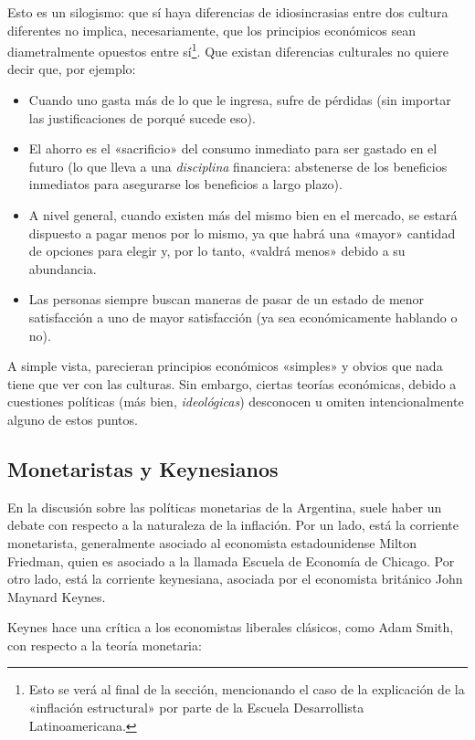 \documentclass[12pt,a4paper,twoside]{book}
\begin{document}
Esto es un silogismo: que sí haya diferencias de idiosincrasias entre dos cultura diferentes no implica, necesariamente, que los principios económicos sean diametralmente opuestos entre sí\footnote{Esto se verá al final de la sección, mencionando el caso de la explicación de la «inflación estructural» por parte de la Escuela Desarrollista Latinoamericana.}. Que existan diferencias culturales no quiere decir que, por ejemplo:

\begin{itemize}
\item Cuando uno gasta más de lo que le ingresa, sufre de pérdidas (sin importar las justificaciones de porqué sucede eso).
\item El ahorro es el «sacrificio» del consumo inmediato para ser gastado en el futuro (lo que lleva a una \textit{disciplina} financiera: abstenerse de los beneficios inmediatos para asegurarse los beneficios a largo plazo).
\item A nivel general, cuando existen más del mismo bien en el mercado, se estará dispuesto a pagar menos por lo mismo, ya que habrá una «mayor» cantidad de opciones para elegir y, por lo tanto, «valdrá menos» debido a su abundancia.
\item Las personas siempre buscan maneras de pasar de un estado de menor satisfacción a uno de mayor satisfacción (ya sea económicamente hablando o no).
\end{itemize}

A simple vista, parecieran principios económicos «simples» y obvios que nada tiene que ver con las culturas. Sin embargo, ciertas teorías económicas, debido a cuestiones políticas (más bien, \textit{ideológicas}) desconocen u omiten intencionalmente alguno de estos puntos.

\subsection{Monetaristas y Keynesianos}
En la discusión sobre las políticas monetarias de la Argentina, suele haber un debate con respecto a la naturaleza de la inflación. Por un lado, está la corriente monetarista, generalmente asociado al economista estadounidense Milton Friedman, quien es asociado a la llamada Escuela de Economía de Chicago. Por otro lado, está la corriente keynesiana, asociada por el economista británico John Maynard Keynes.

Keynes hace una crítica a los economistas liberales clásicos, como Adam Smith, con respecto a la teoría monetaria:
\end{document}

